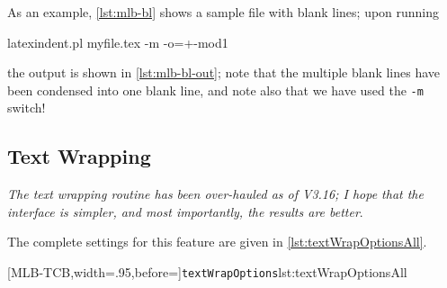 \documentclass[10pt]{article}
\begin{document}
 \begin{example}
 As an example, \cref{lst:mlb-bl} shows a sample file with blank lines; upon running

 \begin{commandshell}
latexindent.pl myfile.tex -m -o=+-mod1 
\end{commandshell}

 the output is shown in \cref{lst:mlb-bl-out}; note that the multiple blank lines have
 been condensed into one blank line, and note also that we have used the \texttt{-m}
 switch!

 \begin{cmhtcbraster}
 \end{cmhtcbraster}
 \end{example}
\subsection{Text Wrapping}\label{subsec:textwrapping}
 \emph{The text wrapping routine has been over-hauled as
 of V3.16; I hope that the interface is simpler, and most importantly, the results are
 better}.

 The complete settings for this feature are given in \cref{lst:textWrapOptionsAll}.

 [MLB-TCB,width=.95\linewidth,before=\centering]{\texttt{textWrapOptions}}{lst:textWrapOptionsAll}
\end{document}
